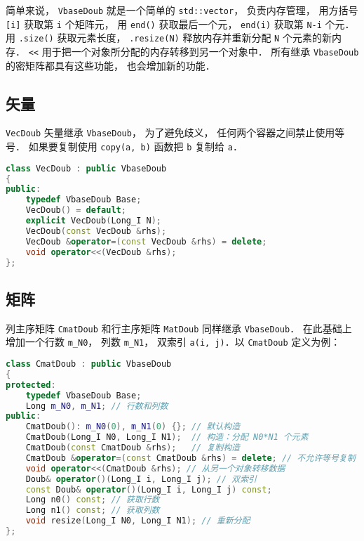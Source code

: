 简单来说， \verb|VbaseDoub| 就是一个简单的 \verb|std::vector|， 负责内存管理， 用方括号 \verb|[i]| 获取第 \verb|i| 个矩阵元， 用 \verb|end()| 获取最后一个元， \verb|end(i)| 获取第 \verb|N-i| 个元． 用 \verb|.size()| 获取元素长度， \verb|.resize(N)| 释放内存并重新分配 \verb|N| 个元素的新内存． \verb|<<| 用于把一个对象所分配的内存转移到另一个对象中． 所有继承 \verb|VbaseDoub| 的密矩阵都具有这些功能， 也会增加新的功能．

\subsection{矢量}
\verb|VecDoub| 矢量继承 \verb|VbaseDoub|， 为了避免歧义， 任何两个容器之间禁止使用等号． 如果要复制使用 \verb|copy(a, b)| 函数把 \verb|b| 复制给 \verb|a|．
\begin{lstlisting}[language=cpp]
class VecDoub : public VbaseDoub
{
public:
    typedef VbaseDoub Base;
    VecDoub() = default;
    explicit VecDoub(Long_I N);
    VecDoub(const VecDoub &rhs);
    VecDoub &operator=(const VecDoub &rhs) = delete;
    void operator<<(VecDoub &rhs);
};
\end{lstlisting}

\subsection{矩阵}
列主序矩阵 \verb|CmatDoub| 和行主序矩阵 \verb|MatDoub| 同样继承 \verb|VbaseDoub|． 在此基础上增加一个行数 \verb|m_N0|， 列数 \verb|m_N1|， 双索引 \verb|a(i, j)|．以 \verb|CmatDoub| 定义为例：
\begin{lstlisting}[language=cpp]
class CmatDoub : public VbaseDoub
{
protected:
    typedef VbaseDoub Base;
    Long m_N0, m_N1; // 行数和列数
public:
    CmatDoub(): m_N0(0), m_N1(0) {}; // 默认构造
    CmatDoub(Long_I N0, Long_I N1);  // 构造：分配 N0*N1 个元素
    CmatDoub(const CmatDoub &rhs);   // 复制构造
    CmatDoub &operator=(const CmatDoub &rhs) = delete; // 不允许等号复制
    void operator<<(CmatDoub &rhs); // 从另一个对象转移数据
    Doub& operator()(Long_I i, Long_I j); // 双索引
    const Doub& operator()(Long_I i, Long_I j) const;
    Long n0() const; // 获取行数
    Long n1() const; // 获取列数
    void resize(Long_I N0, Long_I N1); // 重新分配
};
\end{lstlisting}

